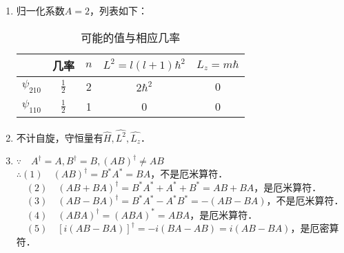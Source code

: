 
\begin{issues}
\issueDraft
\end{issues}


\subsection{ }
\begin{enumerate}
\item 归一化系数$A=2$，列表如下：\\
\begin{table}[ht]
\centering
\caption{可能的值与相应几率}\label{TJU16A_tab1}
\begin{tabular}{|c|c|c|c|c|}
\hline
  & 几率 & $n$ & $L^{2}=l(l+1)\hbar^{2}$ & $L_{z}=m\hbar$ \\
\hline
$\psi_{210}$ & $\displaystyle \frac{1}{2}$ & 2 & $2\hbar^2$ & 0 \\
\hline
$\psi_{110}$ & $\displaystyle \frac{1}{2}$ & 1 & 0 & 0 \\
\hline
\end{tabular}
\end{table}
\item 不计自旋，守恒量有$\hat H,\hat {L^2},\hat {L_z} $．
\item $\because \quad A^{\dagger} = A,B^{\dagger} = B,(AB)^{\dagger} \neq AB $ \\
$\therefore (1)\quad (AB)^{\dagger} = B^*A^* = BA $，不是厄米算符． \\
$\quad (2)\quad (AB+BA)^{\dagger} = B^*A^*+A^*+B^* = AB+BA $，是厄米算符． \\
$\quad (3)\quad (AB-BA)^{\dagger} = B^*A^*-A^*B^* = -(AB-BA) $，不是厄米算符． \\
$\quad (4)\quad (ABA)^{\dagger} = (ABA)^* = ABA $，是厄米算符． \\
$\quad (5)\quad [i(AB-BA)]^{\dagger} = -i(BA-AB) = i(AB-BA) $，是厄密算符．
\end{enumerate}
